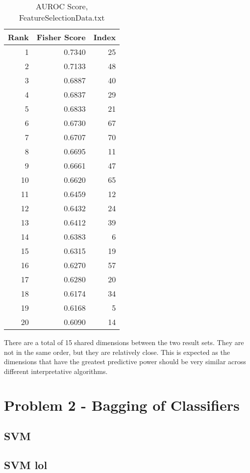 \documentclass[12pt, letterpaper]{report}
\begin{document}
\begin{table}[H]
	\centering
	\begin{tabular}{ |r|r|r| }
		\hline
		\textbf{Rank} & \textbf{Fisher Score} & \textbf{Index} \\
		\hline
		1 & 0.7340 & 25 \\
		\hline
		2 & 0.7133 & 48 \\
		\hline
		3 & 0.6887 & 40 \\
		\hline
		4 & 0.6837 & 29 \\
		\hline
		5 & 0.6833 & 21 \\
		\hline		
		6 & 0.6730 & 67 \\
		\hline
		7 & 0.6707 & 70 \\
		\hline
		8 & 0.6695 & 11 \\
		\hline
		9 & 0.6661 & 47 \\
		\hline
		10 & 0.6620 & 65 \\
		\hline
		11 & 0.6459 & 12 \\
		\hline
		12 & 0.6432 & 24 \\
		\hline
		13 & 0.6412 & 39 \\
		\hline
		14 & 0.6383 & 6 \\
		\hline
		15 & 0.6315 & 19 \\
		\hline
		16 & 0.6270 & 57 \\
		\hline
		17 & 0.6280 & 20 \\
		\hline
		18 & 0.6174 & 34 \\
		\hline
		19 & 0.6168 & 5 \\
		\hline
		20 & 0.6090 & 14 \\
		\hline
	\end{tabular}
	\caption{AUROC Score, FeatureSelectionData.txt}
\end{table}


There are a total of 15 shared dimensions between the two result sets. They are not in the same order, but they are relatively close. This is expected as the dimensions that have the greatest predictive power should be very similar across different interpretative algorithms.


\section{Problem 2 - Bagging of Classifiers}

\subsection{SVM}



\subsection{SVM lol}
\end{document}
